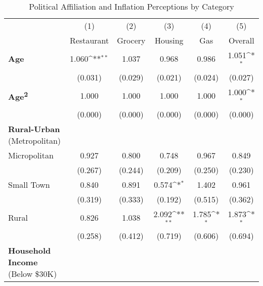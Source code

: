 \begin{table}[htbp]\centering \scriptsize

\def\sym#1{\ifmmode^{#1}\else\(^{#1}\)\fi}
\caption{Political Affiliation and Inflation Perceptions by Category}
\label{tab:pol}
\begin{tabular}{l*{5}{c}}
\hline\hline
                    &\multicolumn{1}{c}{(1)}&\multicolumn{1}{c}{(2)}&\multicolumn{1}{c}{(3)}&\multicolumn{1}{c}{(4)}&\multicolumn{1}{c}{(5)}\\
                    &\multicolumn{1}{c}{Restaurant}&\multicolumn{1}{c}{Grocery}&\multicolumn{1}{c}{Housing}&\multicolumn{1}{c}{Gas}&\multicolumn{1}{c}{Overall}\\
\hline
\textbf{Age}        &       1.060\sym{**} &       1.037         &       0.968         &       0.986         &       1.051\sym{*}  \\
                    &     (0.031)         &     (0.029)         &     (0.021)         &     (0.024)         &     (0.027)         \\
\textbf{Age\textsuperscript{2}}&       1.000         &       1.000         &       1.000         &       1.000         &       1.000\sym{*}  \\
                    &     (0.000)         &     (0.000)         &     (0.000)         &     (0.000)         &     (0.000)         \\
\textbf{Rural-Urban} (Metropolitan) &  &  &  &   & \\
Micropolitan        &       0.927         &       0.800         &       0.748         &       0.967         &       0.849         \\
                    &     (0.267)         &     (0.244)         &     (0.209)         &     (0.250)         &     (0.230)         \\
Small Town          &       0.840         &       0.891         &       0.574\sym{*}  &       1.402         &       0.961         \\
                    &     (0.319)         &     (0.333)         &     (0.192)         &     (0.515)         &     (0.362)         \\
Rural               &       0.826         &       1.038         &       2.092\sym{**} &       1.785\sym{*}  &       1.873\sym{*}  \\
                    &     (0.258)         &     (0.412)         &     (0.719)         &     (0.606)         &     (0.694)         \\
\textbf{Household Income} (Below \$30K) &  &  &  &   & \\

\end{tabular}
\end{table}
